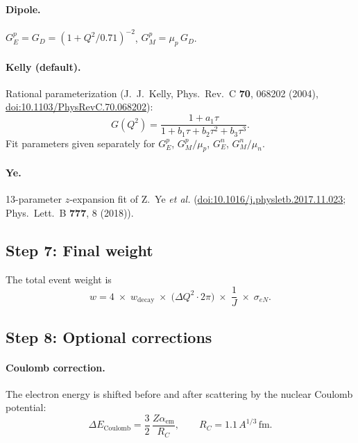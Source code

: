 \documentclass[11pt,a4paper]{article}
\newcommand{\unit}[1]{\,\mathrm{#1}}
\newcommand{\fm}{\unit{fm}}
\begin{document}
\paragraph{Dipole.}
$G_{E}^{p} = G_{D} = (1 + Q^{2}/0.71)^{-2}$, $G_{M}^{p} = \mu_{p}\,G_{D}$.

\paragraph{Kelly (default).}
Rational parameterization (J.~J.~Kelly, Phys.\ Rev.\ C \textbf{70}, 068202 (2004),
\href{https://doi.org/10.1103/PhysRevC.70.068202}{doi:10.1103/PhysRevC.70.068202}):
\begin{equation}
  G(Q^{2}) = \frac{1 + a_{1}\tau}{1 + b_{1}\tau + b_{2}\tau^{2} + b_{3}\tau^{3}}.
\end{equation}
Fit parameters given separately for $G_{E}^{p}$, $G_{M}^{p}/\mu_{p}$,
$G_{E}^{n}$, $G_{M}^{n}/\mu_{n}$.

\paragraph{Ye.}
13-parameter $z$-expansion fit of Z.~Ye \textit{et al.}
(\href{https://doi.org/10.1016/j.physletb.2017.11.023}{doi:10.1016/j.physletb.2017.11.023};
Phys.\ Lett.\ B \textbf{777}, 8 (2018)).

\subsection{Step 7: Final weight}

The total event weight is
\begin{equation}
  w = 4 \;\times\; w_{\text{decay}} \;\times\;
      \bigl(\Delta Q^{2}\cdot 2\pi\bigr) \;\times\; \frac{1}{J}
      \;\times\; \sigma_{eN}.
\end{equation}

\subsection{Step 8: Optional corrections}

\paragraph{Coulomb correction.}
The electron energy is shifted before and after scattering by the nuclear
Coulomb potential:
\begin{equation}
  \Delta E_{\text{Coulomb}}
  = \frac{3}{2}\,\frac{Z\alpha_{\text{em}}}{R_{C}},
  \qquad
  R_{C} = 1.1\,A^{1/3}\fm.
\end{equation}
\end{document}
